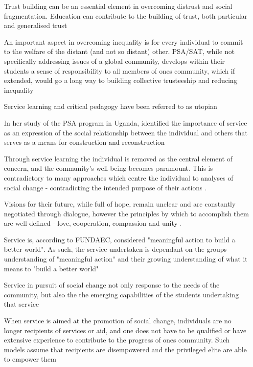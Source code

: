 Trust building can be an essential element in overcoming distrust and social fragmentation. Education can contribute to the building of trust, both particular and generalised trust \citep{Murphy-Graham2014}

An important aspect in overcoming inequality is for every individual to commit to the welfare of the distant (and not so distant) other. PSA/SAT, while not specifically addressing issues of a global community, develops within their students a sense of responsibility to all members of ones community, which if extended, would go a long way to building collective trusteeship and reducing inequality \citep{Murphy-Graham2014}






Service learning and critical pedagogy have been referred to as utopian  \citep{VanderDussen2009}

In her study of the PSA program in Uganda, \citet{VanderDussen2009} identified the importance of service as an expression of the social relationship between the individual and others that serves as a means for construction and reconstruction

Through service learning the individual is removed as the central element of concern, and the community's well-being becomes paramount. This is contradictory to many approaches which centre the individual to analyses of social change - contradicting the intended purpose of their actions \citep{VanderDussen2009}.

Visions for their future, while full of hope, remain unclear and are constantly negotiated through dialogue, however the principles by which to accomplish them are well-defined - love, cooperation, compassion and unity \citep{VanderDussen2009}.

Service is, according to FUNDAEC, considered "meaningful action to build a better world". As such, the service undertaken is dependant on the groups understanding of "meaningful action" and their growing understanding of what it means to "build a better world"  \citep{VanderDussen2009}

Service in pursuit of social change not only response to the needs of the community, but also the the emerging capabilities of the students undertaking that service \citep{VanderDussen2009}

When service is aimed at the promotion of social change, individuals are no longer recipients of services or aid, and one does not have to be qualified or have extensive experience to contribute to the progress of ones community. Such models assume that recipients are disempowered and the privileged elite are able to empower them \citep{VanderDussen2009}

